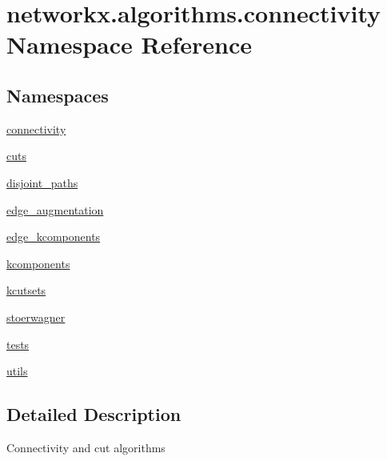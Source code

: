 \hypertarget{namespacenetworkx_1_1algorithms_1_1connectivity}{}\section{networkx.\+algorithms.\+connectivity Namespace Reference}
\label{namespacenetworkx_1_1algorithms_1_1connectivity}
\subsection*{Namespaces}
\begin{DoxyCompactItemize}
\item 
 \hyperlink{namespacenetworkx_1_1algorithms_1_1connectivity_1_1connectivity}{connectivity}
\item 
 \hyperlink{namespacenetworkx_1_1algorithms_1_1connectivity_1_1cuts}{cuts}
\item 
 \hyperlink{namespacenetworkx_1_1algorithms_1_1connectivity_1_1disjoint__paths}{disjoint\+\_\+paths}
\item 
 \hyperlink{namespacenetworkx_1_1algorithms_1_1connectivity_1_1edge__augmentation}{edge\+\_\+augmentation}
\item 
 \hyperlink{namespacenetworkx_1_1algorithms_1_1connectivity_1_1edge__kcomponents}{edge\+\_\+kcomponents}
\item 
 \hyperlink{namespacenetworkx_1_1algorithms_1_1connectivity_1_1kcomponents}{kcomponents}
\item 
 \hyperlink{namespacenetworkx_1_1algorithms_1_1connectivity_1_1kcutsets}{kcutsets}
\item 
 \hyperlink{namespacenetworkx_1_1algorithms_1_1connectivity_1_1stoerwagner}{stoerwagner}
\item 
 \hyperlink{namespacenetworkx_1_1algorithms_1_1connectivity_1_1tests}{tests}
\item 
 \hyperlink{namespacenetworkx_1_1algorithms_1_1connectivity_1_1utils}{utils}
\end{DoxyCompactItemize}


\subsection{Detailed Description}
\begin{DoxyVerb}Connectivity and cut algorithms
\end{DoxyVerb}
 